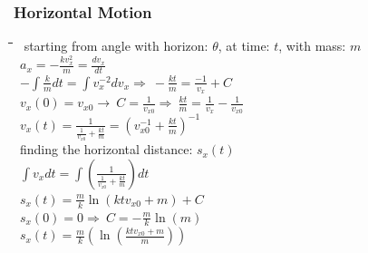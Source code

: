 \documentclass[10pt,letterpaper]{scrartcl}
\newcommand{\tbul}{\textbullet}
\newcommand{\tabDef}{\hspace{2em}\=\hspace{2em}\=\hspace{2em}\=\hspace{2em}\=\kill}
\begin{document}
\subsubsection*{Horizontal Motion}\begin{tabbing}\tabDef
\tbul\ starting from angle with horizon: $\theta$, at time: $t$, with mass: $m$\\
    \>\>\ $\displaystyle a_x = -\frac{kv^2_x}{m} = \frac{dv_x}{dt}$ \\
    \>\>\ $\displaystyle -\int\frac{k}{m}dt = \int v^{-2}_xdv_x\Rightarrow\ -\frac{kt}{m}=\frac{-1}{v_x}+C$\\ 
    \>\>\ $\displaystyle v_x(0) = v_{x0}\rightarrow\ C = \frac{1}{v_{x0}}\Rightarrow\ \frac{kt}{m} = \frac{1}{v_x} - \frac{1}{v_{x0}}$\\
    \>\>\ $\displaystyle v_x(t) = \frac{1}{\frac{1}{v_{x0}} + \frac{kt}{m}} = (v^{-1}_{x0} + \frac{kt}{m})^{-1}$ \\
\tbul\ finding the horizontal distance: $s_x(t)$\\
    \>\>\ $\displaystyle \int v_xdt = \int (\frac{1}{\frac{1}{v_{x0}} + \frac{kt}{m}})dt$ \\
    \>\>\ $\displaystyle s_x(t) = \frac{m}{k}\ln(ktv_{x0}+m)+C$ \\
    \>\>\ $\displaystyle s_x(0) = 0\Rightarrow\ C = -\frac{m}{k}\ln(m)$ \\
    \>\>\ $\displaystyle s_x(t) = \frac{m}{k}(\ln(\frac{ktv_{x0} + m}{m}))$\end{tabbing}
\end{document}
